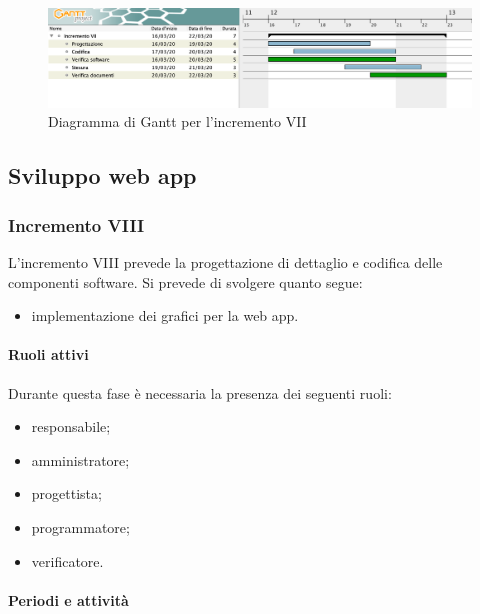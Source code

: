 		\begin{landscape}
          \begin{figure}[H]
            \centering
            \includegraphics[width=\linewidth]{images/gantt/incrementoVII} %
            \caption{Diagramma di Gantt per l'incremento VII}
          \end{figure}		
		\end{landscape}

		\subsection{Sviluppo web app}

		\subsubsection{Incremento VIII}
			
			L'incremento VIII prevede la progettazione di dettaglio e codifica delle componenti software. Si prevede di svolgere quanto segue:
			\begin{itemize}
				\item implementazione dei grafici per la web app.
			\end{itemize}
			
			\paragraph{Ruoli attivi}
			
				Durante questa fase è necessaria la presenza dei seguenti ruoli:
				\begin{itemize}
					\item responsabile;
					\item amministratore;
					\item progettista;
					\item programmatore;
					\item verificatore.
				\end{itemize}
			
			\paragraph{Periodi e attività}
			

